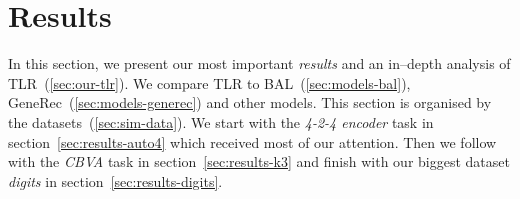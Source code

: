 

\section{Results} 
\label{sec:results} 

In this section, we present our most important \emph{results} and an in--depth analysis of TLR~(\ref{sec:our-tlr}). We compare TLR to BAL~(\ref{sec:models-bal}), GeneRec~(\ref{sec:models-generec}) and other models. This section is organised by the datasets~(\ref{sec:sim-data}). We start with the \emph{4-2-4 encoder} task in section~\ref{sec:results-auto4} which received most of our attention. Then we follow with the \emph{CBVA} task in section~\ref{sec:results-k3} and finish with our biggest dataset \emph{digits} in section~\ref{sec:results-digits}. 

 

 

 

  

